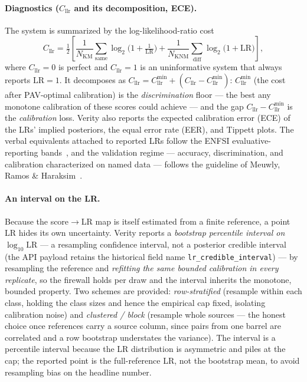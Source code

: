 \documentclass[11pt]{article}
\newcommand{\Cllr}{C_{\mathrm{llr}}}
\newcommand{\Cllrmin}{C_{\mathrm{llr}}^{\min}}
\newcommand{\code}[1]{\texttt{#1}}
\begin{document}
\paragraph{Diagnostics ($\Cllr$ and its decomposition, ECE).}
The system is summarized by the log-likelihood-ratio cost~\cite{brummer2006}
\begin{equation}
  \Cllr = \tfrac12\!\left[
    \frac{1}{N_{\text{KM}}}\!\sum_{\text{same}}\!\log_2\!\Big(1+\tfrac{1}{\mathrm{LR}}\Big)
    +
    \frac{1}{N_{\text{KNM}}}\!\sum_{\text{diff}}\!\log_2\!\big(1+\mathrm{LR}\big)
  \right],
  \label{eq:cllr}
\end{equation}
where $\Cllr=0$ is perfect and $\Cllr=1$ is an uninformative system that always
reports $\mathrm{LR}=1$. It decomposes as $\Cllr = \Cllrmin + (\Cllr-\Cllrmin)$:
$\Cllrmin$ (the cost after PAV-optimal calibration) is the \emph{discrimination}
floor --- the best any monotone calibration of these scores could achieve --- and
the gap $\Cllr-\Cllrmin$ is the \emph{calibration} loss. Verity also reports the
expected calibration error (ECE) of the LRs' implied posteriors, the equal error
rate (EER), and Tippett plots. The verbal equivalents attached to reported LRs
follow the ENFSI evaluative-reporting bands~\cite{enfsi2015}, and the validation
regime --- accuracy, discrimination, and calibration characterized on named data
--- follows the guideline of Meuwly, Ramos \& Haraksim~\cite{meuwly2017}.

\paragraph{An interval on the LR.}
Because the score$\to$LR map is itself estimated from a finite reference, a point LR
hides its own uncertainty. Verity reports a \emph{bootstrap percentile interval on
$\log_{10}\mathrm{LR}$} --- a resampling confidence interval, not a posterior
credible interval (the API payload retains the historical field name
\code{lr\_credible\_interval}) --- by resampling the reference and \emph{refitting
the same bounded calibration in every replicate}, so the firewall holds per draw and
the interval inherits the monotone, bounded property. Two schemes are provided:
\emph{row-stratified} (resample within each class, holding the class sizes and hence
the empirical cap fixed, isolating calibration noise) and \emph{clustered / block}
(resample whole sources --- the honest choice once references carry a source
column, since pairs from one barrel are correlated and a row bootstrap understates
the variance). The interval is a percentile interval because the LR distribution is
asymmetric and piles at the cap; the reported point is the full-reference LR,
not the bootstrap mean, to avoid resampling bias on the headline number.
\end{document}
